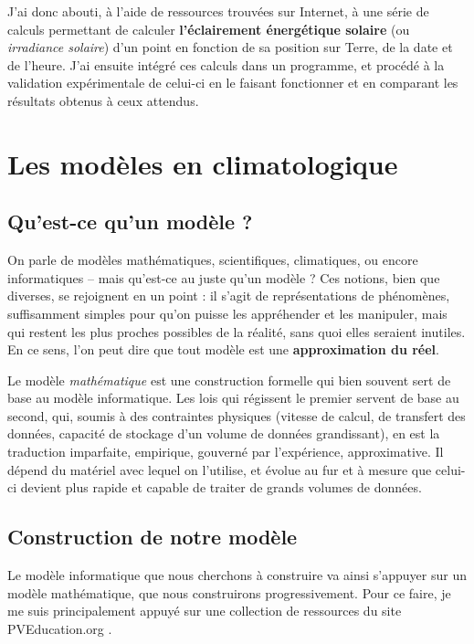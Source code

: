 \documentclass[12pt]{article}
\begin{document}
J'ai donc abouti, à l'aide de ressources trouvées sur Internet, à une série de calculs permettant de calculer \textbf{l'éclairement énergétique solaire} (ou \textit{irradiance solaire}) d'un point en fonction de sa position sur Terre, de la date et de l'heure.
J'ai ensuite intégré ces calculs dans un programme, et procédé à la validation expérimentale de celui-ci en le faisant fonctionner et en comparant les résultats obtenus à ceux attendus.

\clearpage
\section{Les modèles en climatologique} %

\subsection{Qu'est-ce qu'un modèle ?}

On parle de modèles mathématiques, scientifiques, climatiques, ou encore informatiques -- mais qu'est-ce au juste qu'un modèle ?
Ces notions, bien que diverses, se rejoignent en un point : il s'agit de représentations de phénomènes, suffisamment simples pour qu'on puisse les appréhender et les manipuler, mais qui restent les plus proches possibles de la réalité, sans quoi elles seraient inutiles.
En ce sens, l'on peut dire que tout modèle est une \textbf{approximation du réel}.

Le modèle \textit{mathématique} est une construction formelle qui bien souvent sert de base au modèle informatique. Les lois qui régissent le premier servent de base au second, qui, soumis à des contraintes physiques (vitesse de calcul, de transfert des données, capacité de stockage d'un volume de données grandissant), en est la traduction imparfaite, empirique, gouverné par l'expérience, approximative. Il dépend du matériel avec lequel on l'utilise, et évolue au fur et à mesure que celui-ci devient plus rapide et capable de traiter de grands volumes de données.

\subsection{Construction de notre modèle}

Le modèle informatique que nous cherchons à construire va ainsi s'appuyer sur un modèle mathématique, que nous construirons progressivement.
Pour ce faire, je me suis principalement appuyé sur une collection de ressources du site PVEducation.org \cite{properties_of_sunlight}.
\end{document}

